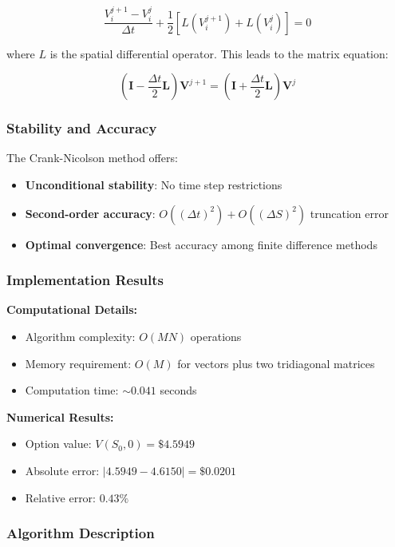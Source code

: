 \documentclass[12pt,a4paper]{article}
\numberwithin{algorithm}{subsection}
\begin{document}
\begin{equation}
\frac{V_i^{j+1} - V_i^j}{\Delta t} + \frac{1}{2} \left[ L(V_i^{j+1}) + L(V_i^j) \right] = 0
\end{equation}

where $L$ is the spatial differential operator. This leads to the matrix equation:

\begin{equation}
(\mathbf{I} - \frac{\Delta t}{2}\mathbf{L}) \mathbf{V}^{j+1} = (\mathbf{I} + \frac{\Delta t}{2}\mathbf{L}) \mathbf{V}^j
\end{equation}

\subsubsection{Stability and Accuracy}

The Crank-Nicolson method offers:
\begin{itemize}
\item \textbf{Unconditional stability}: No time step restrictions
\item \textbf{Second-order accuracy}: $O((\Delta t)^2) + O((\Delta S)^2)$ truncation error
\item \textbf{Optimal convergence}: Best accuracy among finite difference methods
\end{itemize}

\subsubsection{Implementation Results}

\textbf{Computational Details:}
\begin{itemize}
\item Algorithm complexity: $O(MN)$ operations
\item Memory requirement: $O(M)$ for vectors plus two tridiagonal matrices
\item Computation time: $\sim 0.041$ seconds
\end{itemize}

\textbf{Numerical Results:}
\begin{itemize}
\item Option value: $V(S_0, 0) = \$4.5949$
\item Absolute error: $|4.5949 - 4.6150| = \$0.0201$
\item Relative error: $0.43\%$
\end{itemize}

\subsubsection{Algorithm Description}
\end{document}
